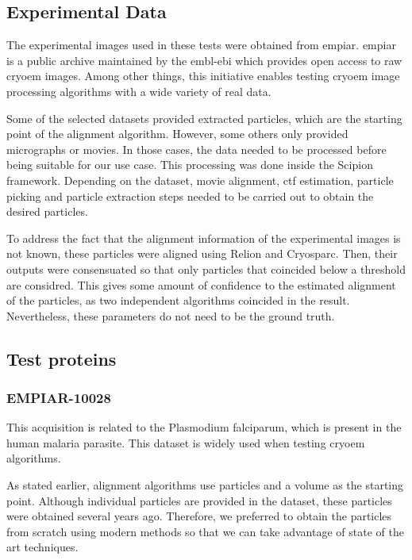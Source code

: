 \documentclass[../main.tex]{subfiles}
\begin{document}
\subsection{Experimental Data}
The experimental images used in these tests were obtained from \gls{empiar}. \Gls{empiar} is a public archive maintained by the \gls{embl}-\gls{ebi} which provides open access to raw \gls{cryoem} images\cite{iudin2022}. Among other things, this initiative enables testing \gls{cryoem} image processing algorithms with a wide variety of real data.

Some of the selected datasets provided extracted particles, which are the starting point of the alignment algorithm. However, some others only provided micrographs or movies. In those cases, the data needed to be processed before being suitable for our use case. This processing was done inside the Scipion framework. Depending on the dataset, movie alignment, \gls{ctf} estimation, particle picking and particle extraction steps needed to be carried out to obtain the desired particles.

To address the fact that the alignment information of the experimental images is not known, these particles were aligned using Relion\cite{scheres2021} and Cryosparc\cite{cryosparc}. Then, their outputs were consensuated so that only particles that coincided below a threshold are considred. This gives some amount of confidence to the estimated alignment of the particles, as two independent algorithms coincided in the result. Nevertheless, these parameters do not need to be the ground truth.

\subsection{Test proteins}
\subsubsection{EMPIAR-10028}
This acquisition is related to the Plasmodium falciparum, which is present in the human malaria parasite\cite{wong2014}. This dataset is widely used when testing \gls{cryoem} algorithms.

As stated earlier, alignment algorithms use particles and a volume as the starting point. Although individual particles are provided in the dataset, these particles were obtained several years ago. Therefore, we preferred to obtain the particles from scratch using modern methods so that we can take advantage of state of the art techniques.
\end{document}
